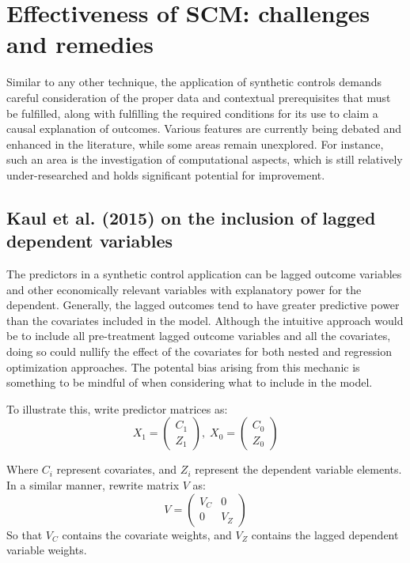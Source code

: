 \documentclass[12pt,a4paper,draft]{article}
\begin{document}
\section{Effectiveness of SCM: challenges and remedies}

Similar to any other technique, the application of synthetic controls demands 
careful consideration of the proper data and contextual prerequisites that must be 
fulfilled, along with fulfilling the required conditions for its use to claim a 
causal explanation of outcomes. Various features are currently being debated and 
enhanced in the literature, while some areas remain unexplored. 
For instance, such an area is the investigation of computational aspects, 
which is still relatively under-researched and holds significant potential for 
improvement.



\subsection{Kaul et al. (2015) on the inclusion of lagged dependent variables}

The predictors in a synthetic control application can be lagged outcome variables and other 
economically relevant variables with explanatory power for the dependent. Generally, 
the lagged outcomes tend to have greater predictive power than the covariates included 
in the model. 
Although the intuitive approach would be to include all pre-treatment lagged outcome 
variables and all the covariates, doing so could nullify the effect of the covariates 
for both nested and regression optimization approaches. The potental bias arising 
from this mechanic is something to be mindful of when considering what to include 
in the model.

To illustrate this, write predictor matrices as:
\begin{equation}
    X_1 = \left( \begin{matrix} C_1 \\ Z_1 \end{matrix} \right), \;
    X_0 = \left( \begin{matrix} C_0 \\ Z_0 \end{matrix} \right)
\end{equation}

Where $C_i$ represent covariates, and $Z_i$ represent the dependent variable elements.
In a similar manner, rewrite matrix $V$ as:
\begin{equation}
    V = \begin{pmatrix}
        V_C & 0 \\
        0 & V_Z
    \end{pmatrix}
\end{equation}
So that $V_C$ contains the covariate weights, and $V_Z$ contains the lagged dependent 
variable weights.
\end{document}

